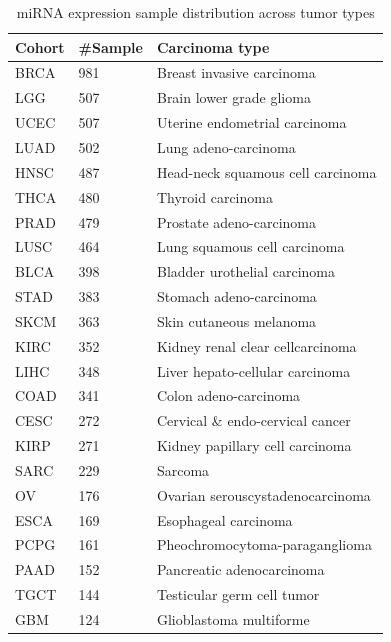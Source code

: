 \begin{table} [!ht] 
    \begin{center}
    \scriptsize
    \caption{miRNA expression sample distribution across tumor types}
        \vspace{-2mm}
    \label{table:MIRNA_dist}
    \begin{tabular}{l|l|l}
        \toprule
         \textbf{Cohort} & \textbf{\#Sample} & \textbf{Carcinoma type} \\\midrule
         BRCA & 981  & Breast invasive carcinoma  \\%
         LGG  & 507  & Brain lower grade glioma \\%
         UCEC & 507  & Uterine endometrial carcinoma \\%
         LUAD & 502  & Lung adeno-carcinoma \\%
         HNSC & 487  & Head-neck squamous cell carcinoma \\%
         THCA & 480  & Thyroid carcinoma \\%
         PRAD & 479  & Prostate adeno-carcinoma \\%
         LUSC & 464  & Lung squamous cell carcinoma \\%
         BLCA & 398  & Bladder urothelial carcinoma \\%
         STAD & 383  & Stomach adeno-carcinoma \\%
         SKCM & 363  & Skin cutaneous melanoma \\%
         KIRC & 352  & Kidney renal clear cellcarcinoma  \\%
         LIHC & 348  & Liver hepato-cellular carcinoma	\\%
         COAD & 341  & Colon adeno-carcinoma \\%
         CESC & 272  & Cervical \& endo-cervical cancer \\%
         KIRP & 271  & Kidney papillary cell carcinoma	\\%
         SARC & 229  & Sarcoma \\%
         OV   & 176  & Ovarian serouscystadenocarcinoma \\%
         ESCA & 169  & Esophageal carcinoma \\%
         PCPG & 161  & Pheochromocytoma-paraganglioma \\%
         PAAD & 152  & Pancreatic adenocarcinoma	\\%
         TGCT & 144  & Testicular germ cell tumor \\%
         GBM  & 124  & Glioblastoma multiforme \\%

\end{tabular}
\end{center}
\end{table}
